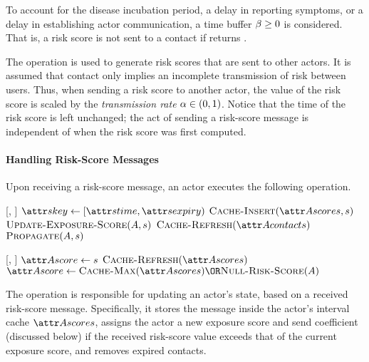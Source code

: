 To account for the disease incubation period, a delay in reporting symptoms, or a delay in establishing actor communication, a time buffer $\beta \geq 0$ is considered. That is, a risk score is not sent to a contact if  returns \false.

The  operation is used to generate risk scores that are sent to other actors. It is assumed that contact only implies an incomplete transmission of risk between users. Thus, when sending a risk score to another actor, the value of the risk score is scaled by the \emph{transmission rate} $\alpha \in (0, 1)$. Notice that the time of the risk score is left unchanged; the act of sending a risk-score message is independent of when the risk score was first computed.


\paragraph{Handling Risk-Score Messages}

Upon receiving a risk-score message, an actor executes the following operation.
%
\begin{function}{\nHandleScoreMessage}[\vActor, \vScore]
        \State $\aScoreKey \assign [\aScoreTime, \aScoreExpiry)$
        \State $\cCacheInsert[\aActorScores, \vScore]$
        \State $\Call{Update-Exposure-Score}{\vActor, \vScore}$
        \State $\cCacheRefresh[\aActorContacts]$
        \State $\cPropagate[\vActor, \vScore]$
    \EndIf
\end{function}
%
\begin{function}{\nUpdateExposureScore}[\vActor, \vScore]
    \If{$\aActorScoreValue < \aScoreValue$}
        \State $\aActorScore \assign \vScore$
        \State $\cCacheRefresh[\aActorScores]$
        \State $\aActorScore \assign \cCacheMax[\aActorScores] \OR \cNullRiskScore[\vActor]$
    \EndIf
\end{function}
%
The  operation is responsible for updating an actor's state, based on a received risk-score message. Specifically, it stores the message inside the actor's interval cache $\aActorScores$, assigns the actor a new exposure score and send coefficient (discussed below) if the received risk-score value exceeds that of the current exposure score, and removes expired contacts.


